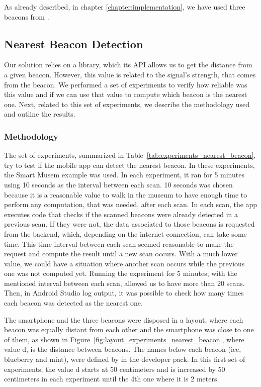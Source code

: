 As already described, in chapter \ref{chapter:implementation}, we have used three beacons from .

\subsection{Nearest Beacon Detection}
\label{sec:evaluation_nearest_beacon}
Our solution relies on a library, which its \gls{API} allows us to get the distance from a given beacon.
However, this value is related to the signal's strength, that comes from the beacon.
We performed a set of experiments to verify how reliable was this value and if we can use that value to compute which beacon is the nearest one.
Next, related to this set of experiments, we describe the methodology used and outline the results.

\subsubsection{Methodology}
\label{sub:evaluation_nearest_beacon_methodology}
The set of experiments, summarized in Table~\ref{tab:experiments_nearest_beacon}, try to test if the mobile app can detect the nearest beacon.
In these experiments, the Smart Musem example was used.
In each experiment, it ran for 5 minutes using 10 seconds as the interval between each scan.
10 seconds was chosen because it is a reasonable value to walk in the museum to have enough time to perform any computation, that was needed, after each scan.
In each scan, the app executes code that checks if the scanned beacons were already detected in a previous scan. If they were not, the data associated to those beacons is requested from the backend, which, depending on the internet connection, can take some time.
This time interval between each scan seemed reasonable to make the request and compute the result until a new scan occurs.
With a much lower value, we could have a situation where another scan occurs while the previous one was not computed yet.
Running the experiment for 5 minutes, with the mentioned interval between each scan, allowed us to have more than 20 scans.
Then, in Android Studio log output, it was possible to check how many times each beacon was detected as the nearest one.

The smartphone and the three beacons were disposed in a layout, where each beacon was equally distant from each other and the smartphone was close to one of them, as shown in Figure~\ref{fig:layout_experiments_nearest_beacon}, where value d, is the distance between beacons.
The names below each beacon (ice, blueberry and mint), were defined by  in
the developer pack.
In this first set of experiments, the value d starts at 50 centimeters and is increased by 50 centimeters in each experiment until the 4th one where it is 2 meters.

